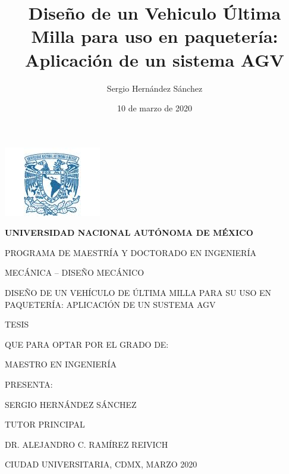 \documentclass[12pt,letterpaper]{book}
\author{Sergio Hernández Sánchez}
\title{Diseño de un Vehiculo Última Milla para uso en paquetería: Aplicación de un sistema AGV}
\date{10 de marzo de 2020}
\begin{document}
\begin{titlepage}
\begin{center}
\includegraphics[scale=1]{Figures/Logo_azul.png}\\
\vspace*{2\baselineskip}
\begin{large}
\textbf{UNIVERSIDAD NACIONAL AUTÓNOMA DE MÉXICO}
\end{large}

PROGRAMA DE MAESTRÍA Y DOCTORADO EN INGENIERÍA

MECÁNICA – DISEÑO MECÁNICO

\vspace*{7\baselineskip}

DISEÑO DE UN VEHÍCULO DE ÚLTIMA MILLA PARA SU USO EN PAQUETERÍA: APLICACIÓN DE UN SUSTEMA AGV

\vspace*{4\baselineskip}

TESIS

QUE PARA OPTAR POR EL GRADO DE:

MAESTRO EN INGENIERÍA

\vspace*{5\baselineskip}

PRESENTA:

SERGIO HERNÁNDEZ SÁNCHEZ

\vspace*{4\baselineskip}

TUTOR PRINCIPAL

DR. ALEJANDRO C. RAMÍREZ REIVICH

\vspace*{4\baselineskip}

CIUDAD UNIVERSITARIA, CDMX, MARZO 2020

\end{center}
\end{titlepage}


\end{document}
